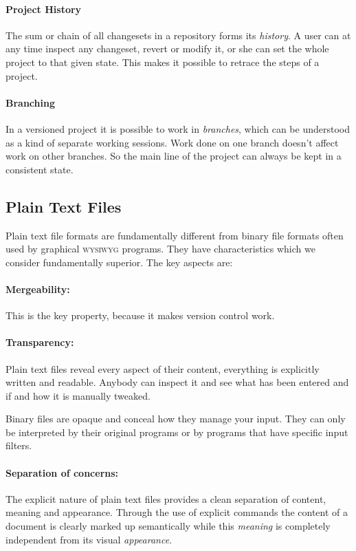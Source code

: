 \documentclass[11pt,a4paper]{article}
\begin{document}
\paragraph{Project History}
The sum or chain of all changesets in a repository forms its \emph{history}. A user can 
at any time inspect any changeset, revert or modify it, or she can set the whole project
to that given state. This makes it possible to retrace the steps of a project.

\paragraph{Branching}
In a versioned project it is possible to work in \emph{branches}, which can be
understood as a kind of separate working sessions. Work done on one branch doesn't affect
work on other branches. So the main line of the project can always be kept in a consistent
state.

\subsection{Plain Text Files}
Plain text file formats are fundamentally different from binary file formats often
used by graphical \textsc{wysiwyg} programs. They have characteristics which we consider fundamentally superior. The key aspects are:

\paragraph{Mergeability:}
This is the key property, because it makes version control work.

\paragraph{Transparency:}
Plain text files reveal every aspect of their content, everything is explicitly written
and readable. Anybody can inspect it and see what has been entered and if and how it is
manually tweaked.

Binary files are opaque and conceal how they manage your input. They can only be
interpreted by their original programs or by programs that have specific input filters.

\paragraph{Separation of concerns:}
The explicit nature of plain text files provides a clean separation of content, meaning
and appearance. Through the use of explicit commands the content
of a document is clearly marked up semantically while this \emph{meaning} is completely
independent from its visual \emph{appearance}.
\end{document}
